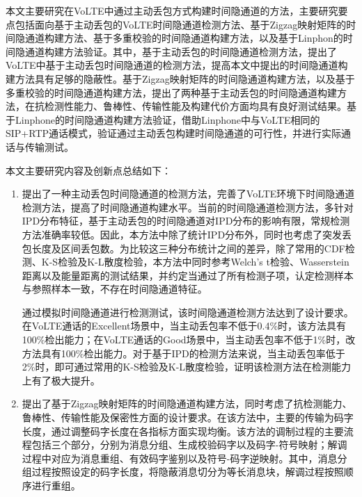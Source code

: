 

\begin{conclusion}

本文主要研究在VoLTE中通过主动丢包方式构建时间隐通道的方法，主要研究要点包括面向基于主动丢包的VoLTE时间隐通道检测方法、基于Zigzag映射矩阵的时间隐通道构建方法、基于多重校验的时间隐通道构建方法，以及基于Linphon的时间隐通道构建方法验证。其中，基于主动丢包的时间隐通道检测方法，提出了VoLTE中基于主动丢包时间隐通道的检测方法，提高本文中提出的时间隐通道构建方法具有足够的隐蔽性。基于Zigzag映射矩阵的时间隐通道构建方法，以及基于多重校验的时间隐通道构建方法，提出了两种基于主动丢包的时间隐通道构建方法，在抗检测性能力、鲁棒性、传输性能及构建代价方面均具有良好测试结果。基于Linphone的时间隐通道构建方法验证，借助Linphone中与VoLTE相同的SIP+RTP通话模式，验证通过主动丢包构建时间隐通道的可行性，并进行实际通话与传输测试。

本文主要研究内容及创新点总结如下：
\begin{enumerate}
    \item
    提出了一种主动丢包时间隐通道的检测方法，完善了VoLTE环境下时间隐通道检测方法，提高了时间隐通道构建水平。当前的时间隐通道检测方法，多针对IPD分布特征，基于主动丢包的时间隐通道对IPD分布的影响有限，常规检测方法准确率较低。因此，本方法中除了统计IPD分布外，同时也考虑了突发丢包长度及区间丢包数。为比较这三种分布统计之间的差异，除了常用的CDF检测、K-S检验及K-L散度检验，本方法中同时参考Welch's t检验、Wasserstein距离以及能量距离的测试结果，并约定当通过了所有检测子项，认定检测样本与参照样本一致，不存在时间隐通道特征。
    
    通过模拟时间隐通道进行检测测试，该时间隐通道检测方法达到了设计要求。在VoLTE通话的Excellent场景中，当主动丢包率不低于0.4\%时，该方法具有100\%检出能力；在VoLTE通话的Good场景中，当主动丢包率不低于1\%时，改方法具有100\%检出能力。对于基于IPD的检测方法来说，当主动丢包率低于2\%时，即可通过常用的K-S检验及K-L散度检验，证明该检测方法在检测能力上有了极大提升。
    
    \item
    提出了基于Zigzag映射矩阵的时间隐通道构建方法，同时考虑了抗检测能力、鲁棒性、传输性能及保密性方面的设计要求。在该方法中，主要的传输为码字长度，通过调整码字长度在各指标方面实现均衡。该方法的调制过程的主要流程包括三个部分，分别为消息分组、生成校验码字以及码字-符号映射；解调过程中对应为消息重组、有效码字鉴别以及符号-码字逆映射。其中，消息分组过程按照设定的码字长度，将隐蔽消息切分为等长消息块，解调过程按照顺序进行重组。
    

\end{enumerate}
\end{conclusion}
